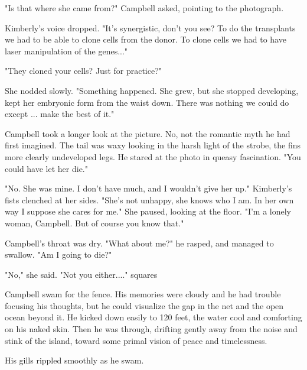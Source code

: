 "Is that where she came from?" Campbell asked, pointing to the photograph.

Kimberly's voice dropped. "It's synergistic, don't you see? To do the transplants we had to be able to clone cells from the donor. To clone cells we had to have laser manipulation of the genes..."

"They cloned your cells? Just for practice?"

She nodded slowly. "Something happened. She grew, but she stopped developing, kept her embryonic form from the waist down. There was nothing we could do except ... make the best of it."

Campbell took a longer look at the picture. No, not the romantic myth he had first imagined. The tail was waxy looking in the harsh light of the strobe, the fins more clearly undeveloped legs. He stared at the photo in queasy fascination. "You could have let her die."

"No. She was mine. I don't have much, and I wouldn't give her up." Kimberly's fists clenched at her sides. "She's not unhappy, she knows who I am. In her own way I suppose she cares for me." She paused, looking at the floor. "I'm a lonely woman, Campbell. But of course you know that."

Campbell's throat was dry. "What about me?" he rasped, and managed to swallow. "Am I going to die?"

"No," she said. "Not you either...."
squares

Campbell swam for the fence. His memories were cloudy and he had trouble focusing his thoughts, but he could visualize the gap in the net and the open ocean beyond it. He kicked down easily to 120 feet, the water cool and comforting on his naked skin. Then he was through, drifting gently away from the noise and stink of the island, toward some primal vision of peace and timelessness.

His gills rippled smoothly as he swam.